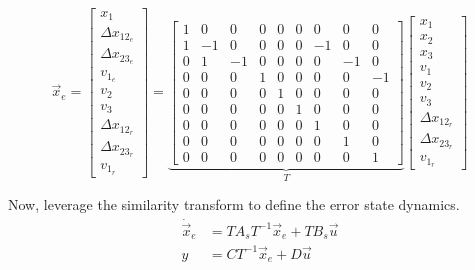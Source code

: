 \documentclass[12pt,onecolumn,reqno]{amsart}
\begin{document}
\begin{equation*}
  \vec{x}_{e} = 
  \begin{bmatrix}
    x_{1}               \\
    \Delta x_{12_{e}}   \\
    \Delta x_{23_{e}}   \\
    v_{1_{e}}           \\
    v_{2}               \\
    v_{3}               \\ 
    \Delta x_{12_{r}}   \\
    \Delta x_{23_{r}}   \\
    v_{1_{r}}
  \end{bmatrix}
  =
  \underbrace{
  \begin{bmatrix}
    1 & 0 & 0 & 0 & 0 & 0 & 0 & 0 & 0 \\
    1 & -1 & 0 & 0 & 0 & 0 & -1 & 0 & 0 \\
    0 & 1 & -1 & 0 & 0 & 0 & 0 & -1 & 0 \\
    0 & 0 & 0 & 1 & 0 & 0 & 0 & 0 & -1 \\
    0 & 0 & 0 & 0 & 1 & 0 & 0 & 0 & 0 \\
    0 & 0 & 0 & 0 & 0 & 1 & 0 & 0 & 0 \\
    0 & 0 & 0 & 0 & 0 & 0 & 1 & 0 & 0 \\
    0 & 0 & 0 & 0 & 0 & 0 & 0 & 1 & 0 \\
    0 & 0 & 0 & 0 & 0 & 0 & 0 & 0 & 1
  \end{bmatrix}
  }_{T}
  \begin{bmatrix}
    x_{1}             \\
    x_{2}             \\
    x_{3}             \\
    v_{1}             \\
    v_{2}             \\
    v_{3}             \\ 
    \Delta x_{12_{r}} \\
    \Delta x_{23_{r}} \\
    v_{1_{r}}
  \end{bmatrix}
\end{equation*}

Now, leverage the similarity transform to define the error state dynamics.
\begin{align*}
  \dot{\vec{x}}_{e} &= T A_{s} T^{-1} \vec{x}_{e} + T B_{s} \vec{u} \\
  y &= C T^{-1} \vec{x}_{e} + D \vec{u}
\end{align*}
\end{document}
